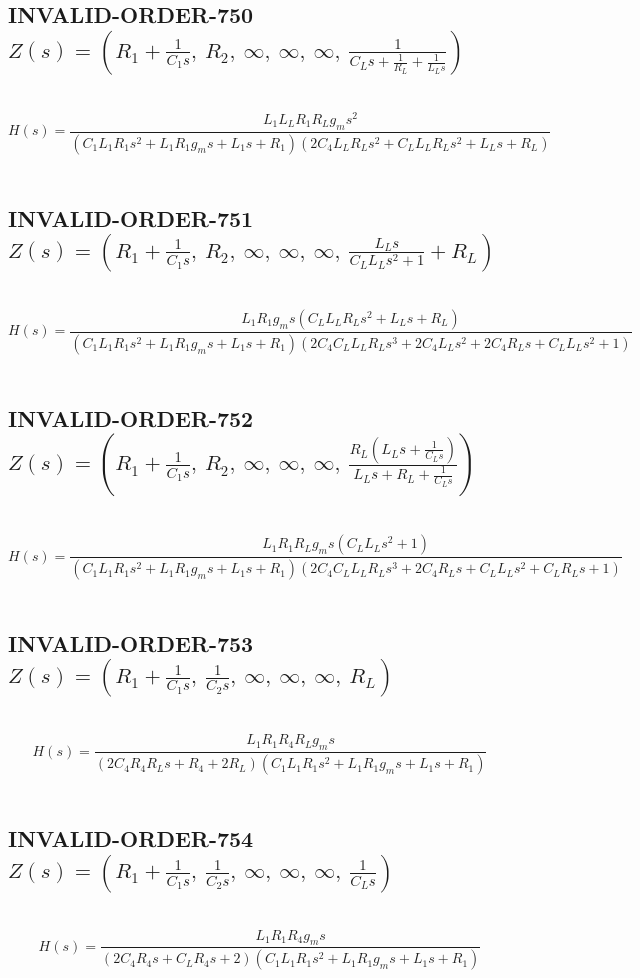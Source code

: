 \documentclass{article}
\begin{document}
\subsection{INVALID-ORDER-750 $Z(s) = \left( R_{1} + \frac{1}{C_{1} s}, \  R_{2}, \  \infty, \  \infty, \  \infty, \  \frac{1}{C_{L} s + \frac{1}{R_{L}} + \frac{1}{L_{L} s}}\right)$ } \ 
\textbf{\[H(s) = \frac{L_{1} L_{L} R_{1} R_{L} g_{m} s^{2}}{\left(C_{1} L_{1} R_{1} s^{2} + L_{1} R_{1} g_{m} s + L_{1} s + R_{1}\right) \left(2 C_{4} L_{L} R_{L} s^{2} + C_{L} L_{L} R_{L} s^{2} + L_{L} s + R_{L}\right)}\] } \ 
\subsection{INVALID-ORDER-751 $Z(s) = \left( R_{1} + \frac{1}{C_{1} s}, \  R_{2}, \  \infty, \  \infty, \  \infty, \  \frac{L_{L} s}{C_{L} L_{L} s^{2} + 1} + R_{L}\right)$ } \ 
\textbf{\[H(s) = \frac{L_{1} R_{1} g_{m} s \left(C_{L} L_{L} R_{L} s^{2} + L_{L} s + R_{L}\right)}{\left(C_{1} L_{1} R_{1} s^{2} + L_{1} R_{1} g_{m} s + L_{1} s + R_{1}\right) \left(2 C_{4} C_{L} L_{L} R_{L} s^{3} + 2 C_{4} L_{L} s^{2} + 2 C_{4} R_{L} s + C_{L} L_{L} s^{2} + 1\right)}\] } \ 
\subsection{INVALID-ORDER-752 $Z(s) = \left( R_{1} + \frac{1}{C_{1} s}, \  R_{2}, \  \infty, \  \infty, \  \infty, \  \frac{R_{L} \left(L_{L} s + \frac{1}{C_{L} s}\right)}{L_{L} s + R_{L} + \frac{1}{C_{L} s}}\right)$ } \ 
\textbf{\[H(s) = \frac{L_{1} R_{1} R_{L} g_{m} s \left(C_{L} L_{L} s^{2} + 1\right)}{\left(C_{1} L_{1} R_{1} s^{2} + L_{1} R_{1} g_{m} s + L_{1} s + R_{1}\right) \left(2 C_{4} C_{L} L_{L} R_{L} s^{3} + 2 C_{4} R_{L} s + C_{L} L_{L} s^{2} + C_{L} R_{L} s + 1\right)}\] } \ 
\subsection{INVALID-ORDER-753 $Z(s) = \left( R_{1} + \frac{1}{C_{1} s}, \  \frac{1}{C_{2} s}, \  \infty, \  \infty, \  \infty, \  R_{L}\right)$ } \ 
\textbf{\[H(s) = \frac{L_{1} R_{1} R_{4} R_{L} g_{m} s}{\left(2 C_{4} R_{4} R_{L} s + R_{4} + 2 R_{L}\right) \left(C_{1} L_{1} R_{1} s^{2} + L_{1} R_{1} g_{m} s + L_{1} s + R_{1}\right)}\] } \ 
\subsection{INVALID-ORDER-754 $Z(s) = \left( R_{1} + \frac{1}{C_{1} s}, \  \frac{1}{C_{2} s}, \  \infty, \  \infty, \  \infty, \  \frac{1}{C_{L} s}\right)$ } \ 
\textbf{\[H(s) = \frac{L_{1} R_{1} R_{4} g_{m} s}{\left(2 C_{4} R_{4} s + C_{L} R_{4} s + 2\right) \left(C_{1} L_{1} R_{1} s^{2} + L_{1} R_{1} g_{m} s + L_{1} s + R_{1}\right)}\] } \ 
\end{document}
